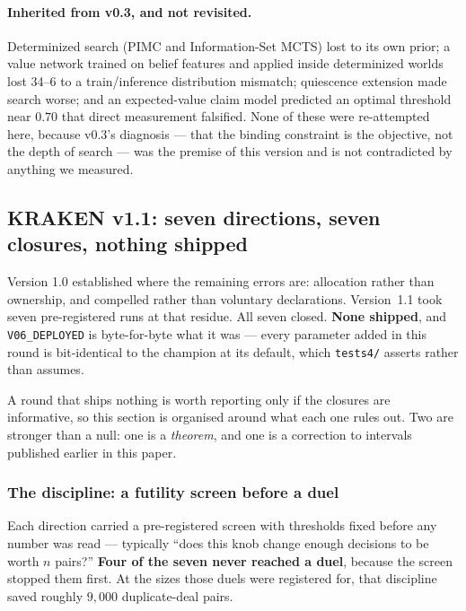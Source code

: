 \documentclass[11pt,letterpaper]{article}
\begin{document}
\paragraph{Inherited from v0.3, and not revisited.} Determinized search (PIMC
and Information-Set MCTS) lost to its own prior; a value network trained on
belief features and applied inside determinized worlds lost 34--6 to a
train/inference distribution mismatch; quiescence extension made search worse;
and an expected-value claim model predicted an optimal threshold near $0.70$
that direct measurement falsified. None of these were re-attempted here, because
v0.3's diagnosis --- that the binding constraint is the objective, not the depth
of search --- was the premise of this version and is not contradicted by
anything we measured.

\subsection{KRAKEN v1.1: seven directions, seven closures, nothing shipped}
\label{sec:v11}

Version 1.0 established where the remaining errors are: allocation rather than
ownership, and compelled rather than voluntary declarations. Version~1.1 took
seven pre-registered runs at that residue. All seven closed. \textbf{None
shipped}, and \texttt{V06\_DEPLOYED} is byte-for-byte what it was --- every
parameter added in this round is bit-identical to the champion at its default,
which \texttt{tests4/} asserts rather than assumes.

A round that ships nothing is worth reporting only if the closures are
informative, so this section is organised around what each one rules out. Two
are stronger than a null: one is a \emph{theorem}, and one is a correction to
intervals published earlier in this paper.

\subsubsection{The discipline: a futility screen before a duel}

Each direction carried a pre-registered screen with thresholds fixed before any
number was read --- typically ``does this knob change enough decisions to be
worth $n$ pairs?'' \textbf{Four of the seven never reached a duel}, because the
screen stopped them first. At the sizes those duels were registered for, that
discipline saved roughly $9{,}000$ duplicate-deal pairs.
\end{document}
